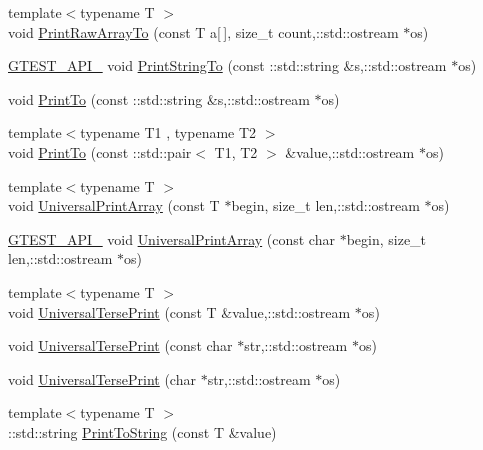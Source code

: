 \begin{DoxyCompactItemize}
\item 
{\footnotesize template$<$typename T $>$ }\\void \hyperlink{namespacetesting_1_1internal_a1fdaffbbe426c547198b1f32e2314dd4}{\-Print\-Raw\-Array\-To} (const \-T a\mbox{[}$\,$\mbox{]}, size\-\_\-t count,\-::std\-::ostream $\ast$os)
\item 
\hyperlink{gtest-port_8h_aa73be6f0ba4a7456180a94904ce17790}{\-G\-T\-E\-S\-T\-\_\-\-A\-P\-I\-\_\-} void \hyperlink{namespacetesting_1_1internal_aec721f06a2afc6a4b5a930d53d00faa5}{\-Print\-String\-To} (const \-::std\-::string \&s,\-::std\-::ostream $\ast$os)
\item 
void \hyperlink{namespacetesting_1_1internal_a671d01d40ea3e199e8d31b7d7eebb53c}{\-Print\-To} (const \-::std\-::string \&s,\-::std\-::ostream $\ast$os)
\item 
{\footnotesize template$<$typename T1 , typename T2 $>$ }\\void \hyperlink{namespacetesting_1_1internal_a29508e1b1e55eb50775c69a8cdeb68c1}{\-Print\-To} (const \-::std\-::pair$<$ \-T1, \-T2 $>$ \&value,\-::std\-::ostream $\ast$os)
\item 
{\footnotesize template$<$typename T $>$ }\\void \hyperlink{namespacetesting_1_1internal_a5a0f5162309823ca1cc9d43607eae2a5}{\-Universal\-Print\-Array} (const \-T $\ast$begin, size\-\_\-t len,\-::std\-::ostream $\ast$os)
\item 
\hyperlink{gtest-port_8h_aa73be6f0ba4a7456180a94904ce17790}{\-G\-T\-E\-S\-T\-\_\-\-A\-P\-I\-\_\-} void \hyperlink{namespacetesting_1_1internal_acb49eae17314fc8f2a6b617fa4205fe6}{\-Universal\-Print\-Array} (const char $\ast$begin, size\-\_\-t len,\-::std\-::ostream $\ast$os)
\item 
{\footnotesize template$<$typename T $>$ }\\void \hyperlink{namespacetesting_1_1internal_ae988148fb759e91d32a2908b3542b25b}{\-Universal\-Terse\-Print} (const \-T \&value,\-::std\-::ostream $\ast$os)
\item 
void \hyperlink{namespacetesting_1_1internal_ae48ed1fb26cf9f2670c340b946cc373b}{\-Universal\-Terse\-Print} (const char $\ast$str,\-::std\-::ostream $\ast$os)
\item 
void \hyperlink{namespacetesting_1_1internal_a3e7d596ecc48aa301ed5e3123a3701fb}{\-Universal\-Terse\-Print} (char $\ast$str,\-::std\-::ostream $\ast$os)
\item 
{\footnotesize template$<$typename T $>$ }\\\-::std\-::string \hyperlink{namespacetesting_a44c473dd1caaed17b53a19dff4e4f7ef}{\-Print\-To\-String} (const \-T \&value)
\end{DoxyCompactItemize}
